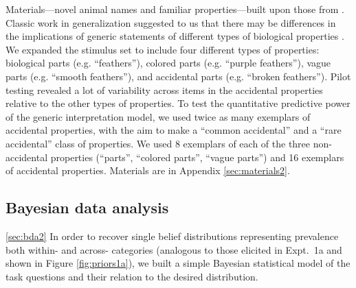 \documentclass[10pt,letterpaper]{article}
\begin{document}
Materials---novel animal names and familiar properties---built upon those from . 
Classic work in generalization suggested to us that there may be differences in the implications of generic statements of different types of biological properties \cite{Nisbett1983}. 
We expanded the stimulus set to include four different types of properties: biological parts (e.g. ``feathers''), colored parts (e.g. ``purple feathers''), vague parts (e.g. ``smooth feathers''), and accidental parts (e.g. ``broken feathers''). 
Pilot testing revealed a lot of variability across items in the accidental properties relative to the other types of properties. 
To test the quantitative predictive power of the generic interpretation model, we used twice as many exemplars of accidental properties, with the aim to make a ``common accidental'' and a ``rare accidental'' class of properties. 
We used 8 exemplars of each of the three non-accidental properties (``parts'', ``colored parts'', ``vague parts'') and 16 exemplars of accidental properties.
Materials are in Appendix \ref{sec:materials2}.

\subsection{Bayesian data analysis}
\ref{sec:bda2}
In order to recover single belief distributions representing prevalence both within- and across- categories (analogous to those elicited in Expt.~1a and shown in Figure \ref{fig:priors1a}), we built a simple Bayesian statistical model of the task questions and their relation to the desired distribution. 
\end{document}
